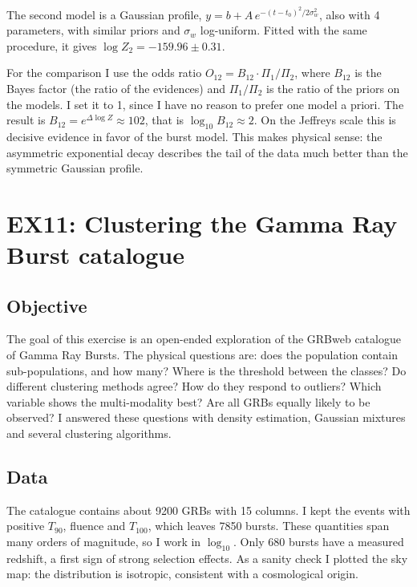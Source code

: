 \documentclass[11pt]{article}
\begin{document}
The second model is a Gaussian profile, $y = b + A\,e^{-(t-t_0)^2/2\sigma_w^2}$, also with 4 parameters, with similar priors and $\sigma_w$ log-uniform. Fitted with the same procedure, it gives $\log Z_2 = -159.96 \pm 0.31$.

For the comparison I use the odds ratio $O_{12} = B_{12}\cdot\Pi_1/\Pi_2$, where $B_{12}$ is the Bayes factor (the ratio of the evidences) and $\Pi_1/\Pi_2$ is the ratio of the priors on the models. I set it to 1, since I have no reason to prefer one model a priori. The result is $B_{12} = e^{\Delta\log Z} \approx 102$, that is $\log_{10}B_{12} \approx 2$. On the Jeffreys scale this is decisive evidence in favor of the burst model. This makes physical sense: the asymmetric exponential decay describes the tail of the data much better than the symmetric Gaussian profile.

\section{EX11: Clustering the Gamma Ray Burst catalogue}

\subsection*{Objective}

The goal of this exercise is an open-ended exploration of the GRBweb catalogue of Gamma Ray Bursts. The physical questions are: does the population contain sub-populations, and how many? Where is the threshold between the classes? Do different clustering methods agree? How do they respond to outliers? Which variable shows the multi-modality best? Are all GRBs equally likely to be observed? I answered these questions with density estimation, Gaussian mixtures and several clustering algorithms.

\subsection*{Data}

The catalogue contains about 9200 GRBs with 15 columns. I kept the events with positive $T_{90}$, fluence and $T_{100}$, which leaves 7850 bursts. These quantities span many orders of magnitude, so I work in $\log_{10}$. Only 680 bursts have a measured redshift, a first sign of strong selection effects. As a sanity check I plotted the sky map: the distribution is isotropic, consistent with a cosmological origin.
\end{document}
